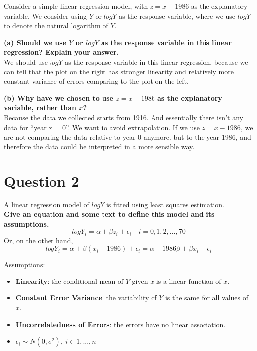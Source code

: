 \documentclass[
]{book}
\providecommand{\tightlist}{%
  \setlength{\itemsep}{0pt}\setlength{\parskip}{0pt}}
\begin{document}
Consider a simple linear regression model, with \(z = x - 1986\) as the explanatory variable. We consider using \(Y\) or \(log Y\) as the response variable, where we use \(log Y\) to denote the natural logarithm of \(Y\).

\textbf{(a) Should we use \(Y\) or \(log Y\) as the response variable in this linear regression? Explain your answer.}\\
We should use \(log Y\) as the response variable in this linear regression, because we can tell that the plot on the right has stronger linearity and relatively more constant variance of errors comparing to the plot on the left.

\textbf{(b) Why have we chosen to use \(z = x - 1986\) as the explanatory variable, rather than \(x\)?}\\
Because the data we collected starts from 1916. And essentially there isn't any data for ``year x = 0''. We want to avoid extrapolation. If we use \(z = x - 1986\), we are not comparing the data relative to year 0 anymore, but to the year 1986, and therefore the data could be interpreted in a more sensible way.

\section{Question 2}\label{question-2-5}

A linear regression model of \(log Y\) is fitted using least squares estimation.\\
\textbf{Give an equation and some text to define this model and its assumptions.}\\
\[log Y_i =  \alpha + \beta z_i + \epsilon_i \quad i = 0, 1, 2, ..., 70\]
Or, on the other hand,
\[log Y_i = \alpha + \beta (x_i - 1986) + \epsilon_i = \alpha -1986\beta + \beta x_i + \epsilon_i\]

Assumptions:

\begin{itemize}
\tightlist
\item
  \textbf{Linearity}: the conditional mean of \(Y\) given \(x\) is a linear function of \(x\).
\item
  \textbf{Constant Error Variance}: the variability of \(Y\) is the same for all values of \(x\).
\item
  \textbf{Uncorrelatedness of Errors}: the errors have no linear association.
\item
  \(\epsilon_i \sim N(0, \sigma^2), \ i \in 1, ..., n\)
\end{itemize}
\end{document}
